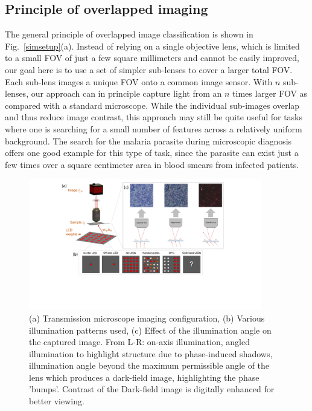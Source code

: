 \documentclass{article}
\begin{document}
\subsection{Principle of overlapped imaging}

The general principle of overlapped image classification is shown in Fig.~\ref{simsetup}(a). Instead of relying on a single objective lens, which is limited to a small FOV of just a few square millimeters and cannot be easily improved, our goal here is to use a set of simpler sub-lenses to cover a larger total FOV. Each sub-lens images a unique FOV onto a common image sensor.  With $n$ sub-lenses, our approach can in principle capture light from an $n$ times larger FOV as compared with a standard microscope. While the individual sub-images overlap and thus reduce image contrast, this approach may still be quite useful for tasks where one is searching for a small number of features across a relatively uniform background. The search for the malaria parasite during microscopic diagnosis offers one good example for this type of task, since the parasite can exist just a few times over a square centimeter area in blood smears from infected patients. 

\begin{figure}
\centering
\includegraphics[height=2.25in]{590L4.pdf}
\caption{(a) Transmission microscope imaging configuration, (b) Various illumination patterns used, (c) Effect of the illumination angle on the captured image. From L-R: on-axis illumination, angled illumination to highlight structure due to phase-induced shadows, illumination angle beyond the maximum permissible angle of the lens which produces a dark-field image, highlighting the phase 'bumps'. Contrast of the Dark-field image is digitally enhanced for better viewing.}
\label{led pat}
\end{figure}
\end{document}
